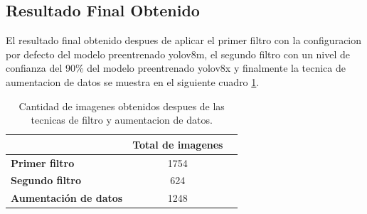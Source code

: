 \subsection{Resultado Final Obtenido}

El resultado final obtenido despues de aplicar el primer filtro con la configuracion por defecto del modelo  preentrenado yolov8m, el segundo filtro con un nivel de confianza del 90\% del modelo preentrenado yolov8x y finalmente la tecnica de aumentacion de datos se muestra en el siguiente cuadro \ref{tab:final_report}.

\begin{table}[ht]
  \centering
  \begin{tabular}{|l|c|c|}
      \hline
       & \textbf{Total de imagenes} \\ \hline
      \textbf{Primer filtro} & 1754 \\ \hline
      \textbf{Segundo filtro} & 624 \\ \hline
      \textbf{Aumentación de datos} & 1248 \\ \hline
  \end{tabular}
  \caption{Cantidad de imagenes obtenidos despues de las tecnicas de filtro y aumentacion de datos.}
  \label{tab:final_report}
\end{table}

